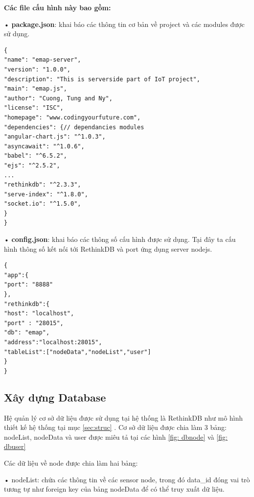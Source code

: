 \textbf{Các file cấu hình này bao gồm:}

• \textbf{package.json}: khai báo các thông tin cơ bản về project và các modules được sử dụng.
\begin{Verbatim}[xleftmargin=2em]
{
"name": "emap-server",
"version": "1.0.0",
"description": "This is serverside part of IoT project",
"main": "emap.js",
"author": "Cuong, Tung and Ny",
"license": "ISC",
"homepage": "www.codingyourfuture.com",
"dependencies": {// dependancies modules
"angular-chart.js": "^1.0.3",
"asyncawait": "^1.0.6",
"babel": "^6.5.2",
"ejs": "^2.5.2",
...
"rethinkdb": "^2.3.3",
"serve-index": "^1.8.0",
"socket.io": "^1.5.0",
}
}
\end{Verbatim}
• \textbf{config.json}: khai báo các thông số cấu hình được sử dụng. Tại đây ta cấu hình thông số kết nối tới RethinkDB và port ứng dụng server nodejs.
\begin{Verbatim}[xleftmargin=2em]
{
"app":{
"port": "8888"
},
"rethinkdb":{
"host": "localhost",
"port" : "28015",
"db": "emap",
"address":"localhost:28015",
"tableList":["nodeData","nodeList","user"]
}
}

\end{Verbatim}





\subsection{Xây dựng Database}
Hệ quản lý cơ sở dữ liệu được sử dụng tại hệ thống là RethinkDB như mô hình thiết kế hệ thống tại mục \ref{sec:struc} . Cơ sở dữ liệu được chia làm 3 bảng: nodeList, nodeData và user được miêu tả tại các hình \ref{fig: dbnode} và \ref{fig: dbuser}

Các dữ liệu về node được chia làm hai bảng:

• nodeList: chứa các thông tin về các sensor node, trong đó data\_id đóng vai trò tương tự như foreign key của bảng nodeData để có thể truy xuất dữ liệu.

